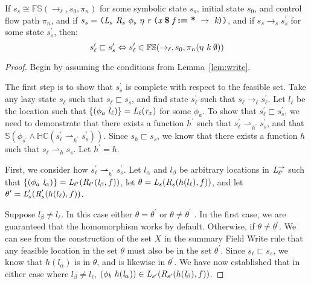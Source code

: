 \begin{lemma}
\label{lem:write}
If $s_s \cong \mathbb{FS}(\rightarrow_\ell, s_0, \pi_n )$ for some symbolic state $s_s$, initial state $s_0$, and control flow path $\pi_n$, and if $s_s =  \lp \cfgnt{L}_s\ \cfgnt{R}_s\ \phi_s\ \eta\ \cfgnt{r}\ \lp \cfgnt{x}\ \cfgt{\$}\ \cfgnt{f}\ \cfgt{:=}\ \cfgt{*}\ \rightarrow\ \cfgnt{k}\rp \rp$, and if $s_s \rightarrow_s s_s^\prime$ for some state $s_s^\prime$, then:
$$s_\ell^\prime \sqsubset s_s^\prime \Leftrightarrow s_\ell^\prime \in \mathbb{FS}(\rightarrow_\ell, s_0, \pi_n (\eta\ \emph{k}\ \emptyset) ) $$

\end{lemma}
\begin{proof}
Begin by assuming the conditions from Lemma~\ref{lem:write}.

The first step is to show that $s_s^\prime$ is complete with respect to the feasible set. Take any lazy state $s_\ell$ such that $s_\ell \sqsubset s_s$, and find state $s_\ell^\prime$ such that $s_\ell \rightarrow_\ell s_\ell^\prime$. Let $l_\ell$ be the location such that $\{(\phi_a\ l_\ell )\} = \emph{L}_\ell(\emph{r}_x) $ for some $\phi_a$. To show that $s_\ell^\prime \sqsubset s_s^\prime$, we need to demonstrate that there exists a function $h^\prime$ such that $s_\ell^\prime \rightharpoonup_{h^\prime} s_s^\prime$, and that $\mathbb{S}(\phi_{s^\prime} \wedge \mathbb{HC}(s_\ell^\prime \rightharpoonup_{h^\prime} s_s^\prime) )$. Since $s_h \sqsubset s_s$, we know that there exists a function $h$ such that $s_\ell \rightharpoonup_{h} s_s$. Let $h^\prime = h$. 

First, we consider how $s_\ell^\prime \rightharpoonup_{h^\prime} s_s^\prime$. Let $l_\alpha$ and $l_\beta$ be arbitrary locations in $\emph{L}_{\ell^\prime}^\rightarrow$ such that $\{(\phi_a\ \emph{l}_\alpha)\} = \emph{L}_{\ell^\prime}(\emph{R}_{\ell^\prime}(\emph{l}_\beta,f ))$, let $\theta = \emph{L}_s(\emph{R}_s(h(l_\ell),f))$, and let $\theta^\prime =   \emph{L}_s^\prime(\emph{R}_s^\prime(h(l_\ell),f))$. 

Suppose $l_\beta \neq l_\ell$. In this case either $\theta = \theta^\prime$ or $\theta \neq \theta^\prime$ . In the first case, we are guaranteed that the homomorphism works by default. Otherwise, if $\theta \neq \theta^\prime$.  We can see from the construction of the set $X$ in the summary Field Write rule that any feasible location in the set $\theta$ must also be in the set $\theta^\prime$. Since $s_\ell \sqsubset s_s$, we know that $h(l_\alpha)$ is in $\theta$, and is likewise in $\theta^\prime$. We have now established that in either case where $l_\beta \neq l_\ell$, $(\phi_b\ h(\emph{l}_\alpha))\in \emph{L}_{s^\prime}(\emph{R}_{s^\prime} (h(\emph{l}_\beta),f ))$.


\end{proof}
